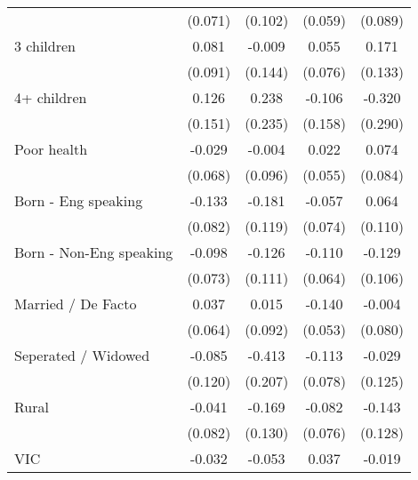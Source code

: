 {\begin{tabular}{l*{4}{c}}
                    &     (0.071)         &     (0.102)         &     (0.059)         &     (0.089)         \\
3 children          &       0.081         &      -0.009         &       0.055         &       0.171         \\
                    &     (0.091)         &     (0.144)         &     (0.076)         &     (0.133)         \\
4+ children         &       0.126         &       0.238         &      -0.106         &      -0.320         \\
                    &     (0.151)         &     (0.235)         &     (0.158)         &     (0.290)         \\
Poor health         &      -0.029         &      -0.004         &       0.022         &       0.074         \\
                    &     (0.068)         &     (0.096)         &     (0.055)         &     (0.084)         \\
Born - Eng speaking &      -0.133         &      -0.181         &      -0.057         &       0.064         \\
                    &     (0.082)         &     (0.119)         &     (0.074)         &     (0.110)         \\
Born - Non-Eng speaking&      -0.098         &      -0.126         &      -0.110\sym{*}  &      -0.129         \\
                    &     (0.073)         &     (0.111)         &     (0.064)         &     (0.106)         \\
Married / De Facto  &       0.037         &       0.015         &      -0.140\sym{***}&      -0.004         \\
                    &     (0.064)         &     (0.092)         &     (0.053)         &     (0.080)         \\
Seperated / Widowed &      -0.085         &      -0.413\sym{**} &      -0.113         &      -0.029         \\
                    &     (0.120)         &     (0.207)         &     (0.078)         &     (0.125)         \\
Rural               &      -0.041         &      -0.169         &      -0.082         &      -0.143         \\
                    &     (0.082)         &     (0.130)         &     (0.076)         &     (0.128)         \\
VIC                 &      -0.032         &      -0.053         &       0.037         &      -0.019         \\

\end{tabular}}
